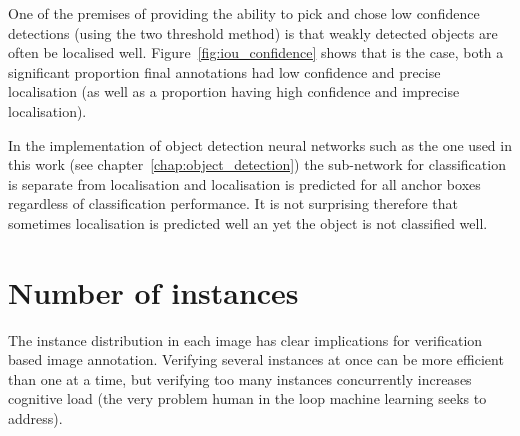 One of the premises of providing the ability to pick and chose low confidence detections (using the two threshold method) is that weakly detected objects are often be localised well. Figure~\ref{fig:iou_confidence} shows that is the case, both a significant proportion final annotations had low confidence and  precise localisation (as well as a proportion having high confidence and imprecise localisation).


\begin{table}[h]
\caption{Breakdown by dataset of detections included as an annotation; confident if $ p > 0.7 $, precise if $ IoU > 0.85 $ with respect to final annotation} 
\noindent{}
\end{table}

In the implementation of object detection neural networks such as the one used in this work (see chapter~\ref{chap:object_detection}) the sub-network for classification is separate from localisation and localisation is predicted for all anchor boxes regardless of classification performance. It is not surprising therefore that sometimes localisation is predicted well an yet the object is not classified well.


\section{Number of instances}
\label{sec:instances_discussion}

The instance distribution in each image has clear implications for verification based image annotation. Verifying several instances at once can be more efficient than one at a time, but verifying too many instances concurrently increases cognitive load (the very problem human in the loop machine learning seeks to address). 

